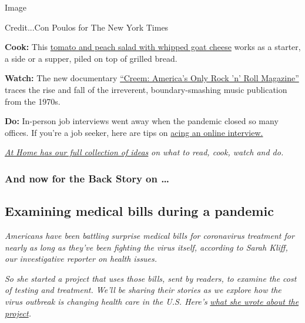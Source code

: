 Image

Credit...Con Poulos for The New York Times

\textbf{Cook:} This
\href{https://cooking.nytimes.com/recipes/1020367-tomato-and-peach-salad-with-whipped-goat-cheese}{tomato
and peach salad with whipped goat cheese} works as a starter, a side or
a supper, piled on top of grilled bread.

\textbf{Watch:} The new documentary
\href{https://www.nytimes.com/2020/08/03/arts/music/creem-magazine-documentary.html?action=click\&module=RelatedLinks\&pgtype=collection}{``Creem:
America's Only Rock 'n' Roll Magazine''} traces the rise and fall of the
irreverent, boundary-smashing music publication from the 1970s.

\textbf{Do:} In-person job interviews went away when the pandemic closed
so many offices. If you're a job seeker, here are tips on
\href{https://www.nytimes.com/2020/08/03/business/online-job-interview-tips.html}{acing
an online interview.}

\href{https://www.nytimes.com/spotlight/at-home}{\emph{At Home has our
full collection of ideas}} \emph{on what to read, cook, watch and do.}

\hypertarget{and-now-for-the-back-story-on-}{%
\subsubsection{And now for the Back Story on
\ldots{}}\label{and-now-for-the-back-story-on-}}

\hypertarget{examining-medical-bills-during-a-pandemic}{%
\subsection{Examining medical bills during a
pandemic}\label{examining-medical-bills-during-a-pandemic}}

\emph{Americans have been battling surprise medical bills for
coronavirus treatment for nearly as long as they've been fighting the
virus itself, according to Sarah Kliff, our investigative reporter on
health issues.}

\emph{So she started a project that uses those bills, sent by readers,
to examine the cost of testing and treatment. We'll be sharing their
stories as we explore how the virus outbreak is changing health care in
the U.S. Here's}
\href{https://www.nytimes.com/2020/08/03/reader-center/coronavirus-medical-bills.html}{\emph{what
she wrote about the project}}\emph{.}

